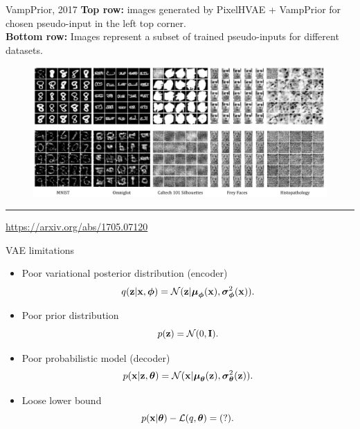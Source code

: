 \begin{frame}{VampPrior, 2017}
	\vspace{0.1cm}
	\textbf{Top row:} images generated by PixelHVAE + VampPrior for chosen pseudo-input in the left top corner. \\
	\vspace{0.1cm}
	\textbf{Bottom row:} Images represent a subset of trained pseudo-inputs for different datasets.
	\begin{figure}[h]
		\centering
		\includegraphics[width=1.0\linewidth]{figs/VampPrior_4.png}
	\end{figure}
	\vfill
	\hrule\medskip
	{\scriptsize \href{https://arxiv.org/abs/1705.07120}{https://arxiv.org/abs/1705.07120}}
\end{frame}
\begin{frame}{VAE limitations}
\begin{itemize}
	\item Poor variational posterior distribution (encoder)
	\[
	q(\mathbf{z} | \mathbf{x}, \boldsymbol{\phi}) = \mathcal{N}(\mathbf{z}| \boldsymbol{\mu}_{\boldsymbol{\phi}}(\mathbf{x}), \boldsymbol{\sigma}^2_{\boldsymbol{\phi}}(\mathbf{x})).
	\]
	\item Poor prior distribution
	\[
	p(\mathbf{z}) = \mathcal{N}(0, \mathbf{I}).
	\]
	\item Poor probabilistic model (decoder)
	\[
	p(\mathbf{x} | \mathbf{z}, \boldsymbol{\theta}) = \mathcal{N}(\mathbf{x}| \boldsymbol{\mu}_{\boldsymbol{\theta}}(\mathbf{z}), \boldsymbol{\sigma}^2_{\boldsymbol{\theta}}(\mathbf{z})).
	\]
	\item Loose lower bound
	\[
	p(\mathbf{x} | \boldsymbol{\theta}) - \mathcal{L}(q, \boldsymbol{\theta}) = (?).
	\]
\end{itemize}
\end{frame}
